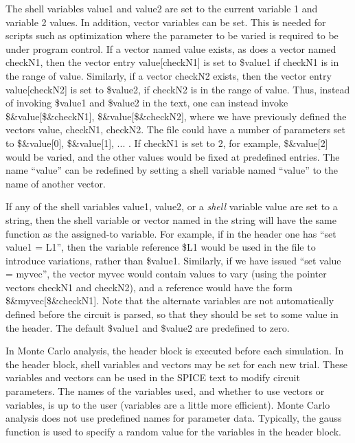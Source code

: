 The shell variables {\et value1} and {\et value2} are set to the
current variable 1 and variable 2 values.  In addition, vector
variables can be set.  This is needed for scripts such as optimization
where the parameter to be varied is required to be under program
control.  If a vector named {\et value} exists, as does a vector named
{\et checkN1}, then the vector entry {\et value[{\et checkN1\/}]} is
set to {\vt \$value1} if {\et checkN1} is in the range of {\et value}. 
Similarly, if a vector {\et checkN2} exists, then the vector entry
{\et value[{\et checkN2\/}]} is set to {\vt \$value2}, if {\et
checkN2} is in the range of {\et value}.  Thus, instead of invoking
{\vt \$value1} and {\vt \$value2} in the {\WRspice} text, one can
instead invoke {\vt \$\&value[\$\&checkN1]}, {\vt
\$\&value[\$\&checkN2]}, where we have previously defined the vectors
{\et value}, {\et checkN1}, {\et checkN2}.  The file could have a
number of parameters set to {\vt \$\&value[0]}, {\vt \$\&value[1]},
...  .  If {\et checkN1} is set to 2, for example, {\vt \$\&value[2]}
would be varied, and the other values would be fixed at predefined
entries.  The name ``value'' can be redefined by setting a shell
variable named ``{\vt value}'' to the name of another vector.

If any of the shell variables {\et value1}, {\et value2}, or a {\it
shell} variable {\et value} are set to a string, then the shell
variable or vector named in the string will have the same function as
the assigned-to variable.  For example, if in the header one has
``{\vt set value1 = L1}'', then the variable reference {\vt \$L1}
would be used in the file to introduce variations, rather than {\vt
\$value1}.  Similarly, if we have issued ``{\vt set value = myvec}'',
the vector {\et myvec} would contain values to vary (using the pointer
vectors {\et checkN1} and {\et checkN2}), and a reference would have
the form {\vt \$\&myvec[\$\&checkN1]}.  Note that the alternate
variables are not automatically defined before the circuit is parsed,
so that they should be set to some value in the header.  The default
{\vt \$value1} and {\vt \$value2} are predefined to zero.

In Monte Carlo analysis, the header block is executed before each
simulation.  In the header block, shell variables and vectors may be
set for each new trial.  These variables and vectors can be used in
the SPICE text to modify circuit parameters.  The names of the
variables used, and whether to use vectors or variables, is up to the
user (variables are a little more efficient).  Monte Carlo analysis
does not use predefined names for parameter data.  Typically, the {\vt
gauss} function is used to specify a random value for the variables
in the header block.

